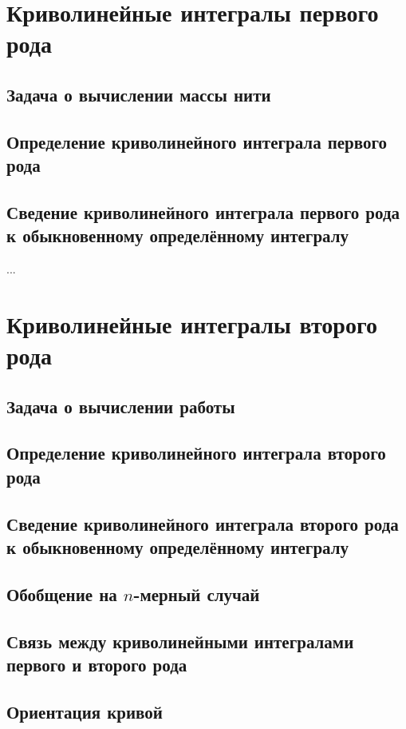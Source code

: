 \section{Криволинейные интегралы первого рода}
\subsection{Задача о вычислении массы нити}

\subsection{Определение криволинейного интеграла первого рода}

\subsection{Сведение криволинейного интеграла первого рода к обыкновенному определённому интегралу}


...

\section{Криволинейные интегралы второго рода}
\subsection{Задача о вычислении работы}
\subsection{Определение криволинейного интеграла второго рода}
\subsection{Сведение криволинейного интеграла второго рода к обыкновенному определённому интегралу}
\subsection{Обобщение на $n$-мерный случай}
\subsection{Связь между криволинейными интегралами первого и второго рода}
\subsection{Ориентация кривой}

